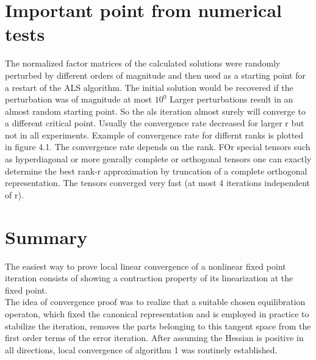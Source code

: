\documentclass[10pt, draft]{article}
\begin{document}
\section{  Important point from numerical tests}
  
  The normalized factor matrices of the calculated solutions were randomly perturbed by different orders of magnitude and then used as a starting point for a restart of the ALS algorithm.  The initial solution would be recovered if the perturbation was of magnitude at most $10^0$ Larger perturbations result in an almost random starting point.  So the als iteration almost surely will converge to a different critical point.  Usually the convergence rate decreased for larger r but not in all experiments.  Example of convergence rate for differnt ranks is plotted in figure 4.1.  The convergence rate depends on the rank.  FOr special tensors such as hyperdiagonal or more genrally complete or orthogonal tensors one can exactly determine the best rank-r approximation by truncation of a complete orthogonal representation.  The tensors converged very fast (at most 4 iterations independent of r).
  
  \section{Summary}
  The easiest way to prove local linear convergence of a nonlinear fixed point iteration consists of showing a contraction property of its linearization at the fixed point.  \\
  The idea of convergence proof was to realize that a suitable chosen equilibration operaton, which fixed the canonical representation and is employed in practice to stabilize the iteration, removes the parts belonging to this tangent space from the first order terms of the error iteration.  After assuming the Hessian is positive in all directions, local convergence of algorithm 1 was routinely established.  
  
 
\end{document}
